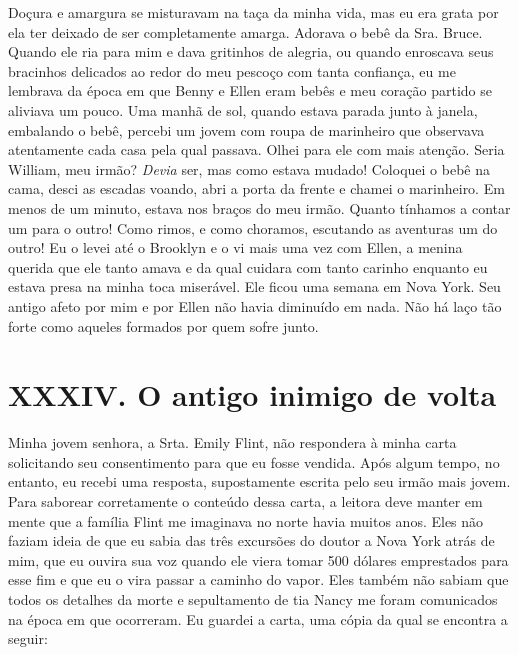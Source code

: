 Doçura e amargura se misturavam na taça
da minha vida, mas eu era grata por ela ter deixado de ser completamente
amarga. Adorava o bebê da Sra. Bruce. Quando ele ria para mim e dava
gritinhos de alegria, ou quando enroscava seus bracinhos delicados ao
redor do meu pescoço com tanta confiança, eu me lembrava da época em que
Benny e Ellen eram bebês e meu coração partido se aliviava um pouco. Uma
manhã de sol, quando estava parada junto à janela, embalando o bebê,
percebi um jovem com roupa de marinheiro que observava atentamente cada
casa pela qual passava. Olhei para ele com mais atenção. Seria William,
meu irmão? \emph{Devia} ser, mas como estava mudado! Coloquei o bebê na
cama, desci as escadas voando, abri a porta da frente e chamei o
marinheiro. Em menos de um minuto, estava nos braços do meu irmão.
Quanto tínhamos a contar um para o outro! Como rimos, e como choramos,
escutando as aventuras um do outro! Eu o levei até o Brooklyn e o vi
mais uma vez com Ellen, a menina querida que ele tanto amava e da qual
cuidara com tanto carinho enquanto eu estava presa na minha toca
miserável. Ele ficou uma semana em Nova York. Seu antigo afeto por mim e
por Ellen não havia diminuído em nada. Não há laço tão forte como
aqueles formados por quem sofre junto.

\chapter{XXXIV. O antigo inimigo de
volta}

Minha jovem senhora, a Srta. Emily
Flint, não respondera à minha carta solicitando seu consentimento para
que eu fosse vendida. Após algum tempo, no entanto, eu recebi uma
resposta, supostamente escrita pelo seu irmão mais jovem. Para saborear
corretamente o conteúdo dessa carta, a leitora deve manter em mente que
a família Flint me imaginava no norte havia muitos anos. Eles não faziam
ideia de que eu sabia das três excursões do doutor a Nova York atrás de
mim, que eu ouvira sua voz quando ele viera tomar 500 dólares
emprestados para esse fim e que eu o vira passar a caminho do vapor.
Eles também não sabiam que todos os detalhes da morte e sepultamento de
tia Nancy me foram comunicados na época em que ocorreram. Eu guardei a
carta, uma cópia da qual se encontra a seguir:

